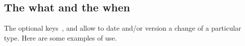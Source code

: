 \documentclass[theme = color]{tutodoc}
\begin{document}
\subsection{The what and the when}

The optional keys \,,  and  allow to date and/or version a change of a particular type.
Here are some examples of use.

\end{document}
